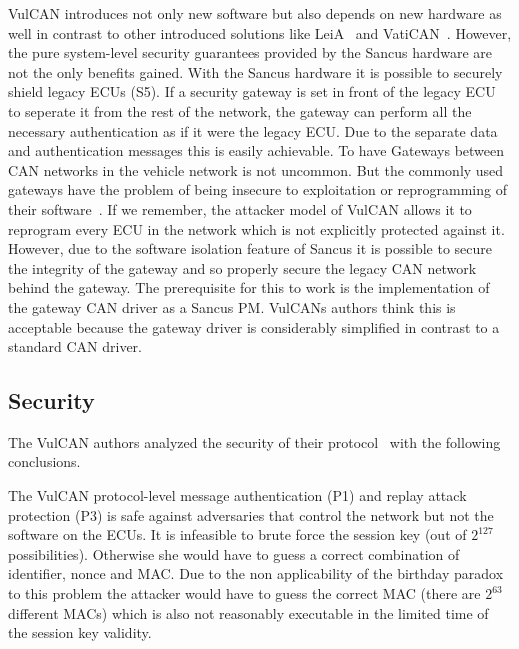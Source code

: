 VulCAN introduces not only new software but also depends on new hardware as well
in contrast to other introduced solutions like LeiA~\cite{Radu2016} and
VatiCAN~\cite{Nurnberger2016}. However, the pure system-level security
guarantees provided by the Sancus hardware are not the only benefits gained.
With the Sancus hardware it is possible to securely shield legacy ECUs (S5). If
a security gateway is set in front of the legacy ECU to seperate it from the
rest of the network, the gateway can perform all the necessary authentication as
if it were the legacy ECU\@. Due to the separate data and authentication
messages this is easily achievable. To have Gateways between CAN networks in the
vehicle network is not uncommon. But the commonly used gateways have the problem
of being insecure to exploitation or reprogramming of their
software~\cite{Checkoway2011}. If we remember, the attacker model of VulCAN
allows it to reprogram every ECU in the network which is not explicitly
protected against it. However, due to the software isolation feature of Sancus
it is possible to secure the integrity of the gateway and so properly secure the
legacy CAN network behind the gateway. The prerequisite for this to work is the
implementation of the gateway CAN driver as a Sancus PM\@. VulCANs authors think
this is acceptable because the gateway driver is considerably simplified in
contrast to a standard CAN driver.

\subsection{Security}

The VulCAN authors analyzed the security of their protocol~\cite{VanBulck2017} with the following conclusions.

\smallskip
The VulCAN protocol-level message authentication (P1) and replay attack protection (P3) is safe against adversaries that control the network but not the software on the ECUs. It is infeasible to brute force the session key (out of $2^{127}$ possibilities). Otherwise she would have to guess a correct combination of identifier, nonce and MAC\@. Due to the non applicability of the birthday paradox to this problem the attacker would have to guess the correct MAC (there are $2^{63}$ different MACs) which is also not reasonably executable in the limited time of the session key validity. 